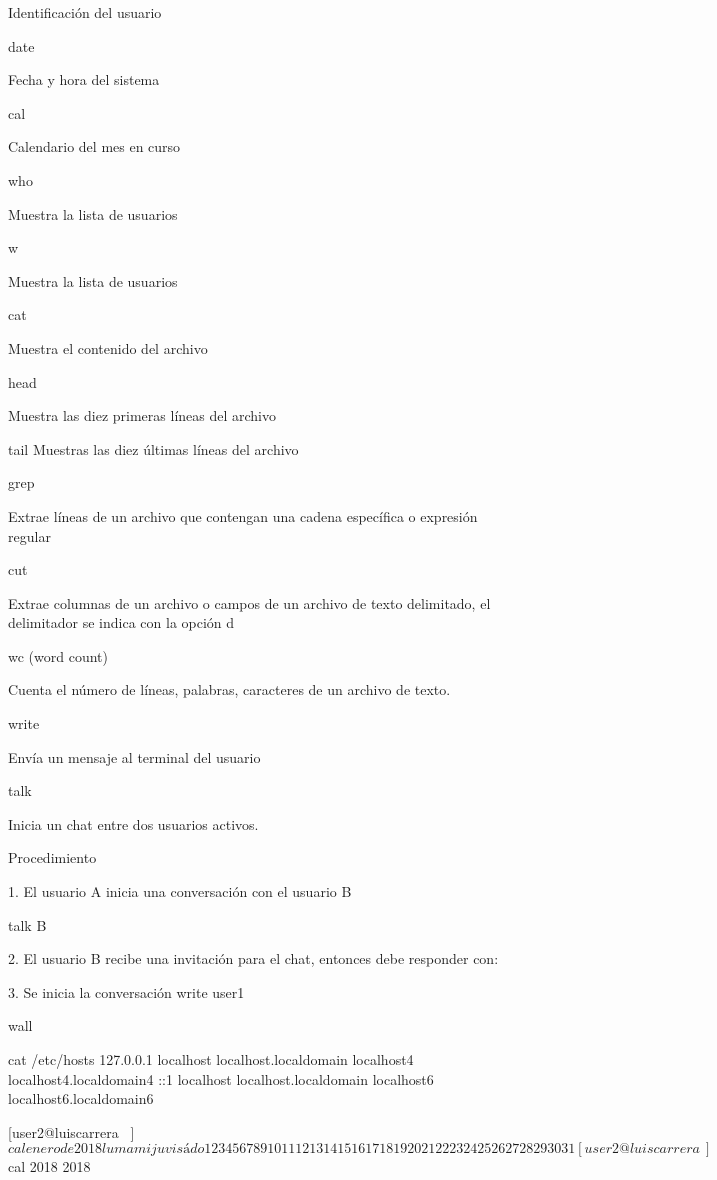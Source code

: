 \documentclass{memoir}
\begin{document}
Identificación del usuario

date

Fecha y hora del sistema

cal

Calendario del mes en curso

who

Muestra la lista de usuarios

w

Muestra la lista de usuarios

cat

Muestra el contenido del archivo

head

Muestra las diez primeras líneas del archivo

tail Muestras las diez últimas líneas del archivo

grep

Extrae líneas de un archivo que contengan una cadena específica o expresión regular

cut

Extrae columnas de un archivo o campos de un archivo de texto delimitado, el delimitador se indica con la opción d

wc (word count)

Cuenta el número de líneas, palabras, caracteres de un archivo de texto.

write

Envía un mensaje al terminal del usuario

talk

Inicia un chat entre dos usuarios activos.

Procedimiento

1. El usuario A inicia una conversación con el usuario B

talk B

2. El usuario B recibe una invitación para el chat, entonces debe responder con:

3. Se inicia la conversación
write user1

wall

 cat /etc/hosts
127.0.0.1   localhost localhost.localdomain localhost4 localhost4.localdomain4
::1         localhost localhost.localdomain localhost6 localhost6.localdomain6

[user2@luiscarrera ~]$ cal
    enero de 2018
lu ma mi ju vi sá do
 1  2  3  4  5  6  7
 8  9 10 11 12 13 14
15 16 17 18 19 20 21
22 23 24 25 26 27 28
29 30 31

[user2@luiscarrera ~]$ cal 2018
                               2018
\end{document}
